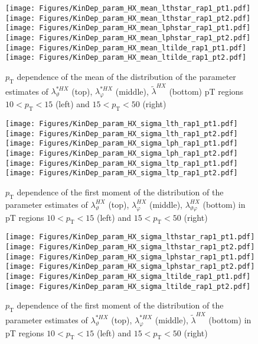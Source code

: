 \documentclass[12pt]{article}
\newcommand{\pT}{p_\mathrm{T}}
\newcommand{\lamthHX}{\lambda^{\scriptscriptstyle HX}_\vartheta}
\newcommand{\lamphHX}{\lambda^{\scriptscriptstyle HX}_\varphi}
\newcommand{\lamthphHX}{\lambda^{\scriptscriptstyle HX}_{\vartheta \varphi}}
\newcommand{\lamtildeHX}{\tilde{\lambda}^{\scriptscriptstyle HX}}
\newcommand{\lamthstarHX}{\lambda^{* \scriptscriptstyle HX}_\vartheta}
\newcommand{\lamphstarHX}{\lambda^{* \scriptscriptstyle HX}_\varphi}
\begin{document}
\begin{figure}[htbp]
\centering
\texttt{[image: Figures/KinDep\_param\_HX\_mean\_lthstar\_rap1\_pt1.pdf]}
\texttt{[image: Figures/KinDep\_param\_HX\_mean\_lthstar\_rap1\_pt2.pdf]}
\texttt{[image: Figures/KinDep\_param\_HX\_mean\_lphstar\_rap1\_pt1.pdf]}
\texttt{[image: Figures/KinDep\_param\_HX\_mean\_lphstar\_rap1\_pt2.pdf]}
\texttt{[image: Figures/KinDep\_param\_HX\_mean\_ltilde\_rap1\_pt1.pdf]}
\texttt{[image: Figures/KinDep\_param\_HX\_mean\_ltilde\_rap1\_pt2.pdf]}
\caption{$\pT$ dependence of the mean of the distribution of the parameter estimates of $\lamthstarHX$ (top), $\lamphstarHX$ (middle), $\lamtildeHX$ (bottom) pT regions $10<\pT<15$ (left) and $15<\pT<50$ (right)}
\end{figure}
\clearpage


\begin{figure}[htbp]
\centering
\texttt{[image: Figures/KinDep\_param\_HX\_sigma\_lth\_rap1\_pt1.pdf]}
\texttt{[image: Figures/KinDep\_param\_HX\_sigma\_lth\_rap1\_pt2.pdf]}
\texttt{[image: Figures/KinDep\_param\_HX\_sigma\_lph\_rap1\_pt1.pdf]}
\texttt{[image: Figures/KinDep\_param\_HX\_sigma\_lph\_rap1\_pt2.pdf]}
\texttt{[image: Figures/KinDep\_param\_HX\_sigma\_ltp\_rap1\_pt1.pdf]}
\texttt{[image: Figures/KinDep\_param\_HX\_sigma\_ltp\_rap1\_pt2.pdf]}
\caption{$\pT$ dependence of the first moment of the distribution of the parameter estimates of $\lamthHX$ (top), $\lamphHX$ (middle), $\lamthphHX$ (bottom) in pT regions $10<\pT<15$ (left) and $15<\pT<50$ (right)}
\end{figure}
\clearpage

\begin{figure}[htbp]
\centering
\texttt{[image: Figures/KinDep\_param\_HX\_sigma\_lthstar\_rap1\_pt1.pdf]}
\texttt{[image: Figures/KinDep\_param\_HX\_sigma\_lthstar\_rap1\_pt2.pdf]}
\texttt{[image: Figures/KinDep\_param\_HX\_sigma\_lphstar\_rap1\_pt1.pdf]}
\texttt{[image: Figures/KinDep\_param\_HX\_sigma\_lphstar\_rap1\_pt2.pdf]}
\texttt{[image: Figures/KinDep\_param\_HX\_sigma\_ltilde\_rap1\_pt1.pdf]}
\texttt{[image: Figures/KinDep\_param\_HX\_sigma\_ltilde\_rap1\_pt2.pdf]}
\caption{$\pT$ dependence of the first moment of the distribution of the parameter estimates of $\lamthstarHX$ (top), $\lamphstarHX$ (middle), $\lamtildeHX$ (bottom) in pT regions $10<\pT<15$ (left) and $15<\pT<50$ (right)}
\end{figure}
\clearpage
\end{document}
